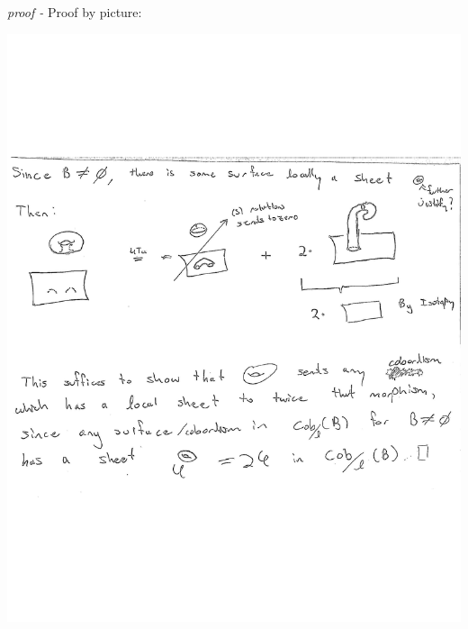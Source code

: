 \documentclass[11pt]{article}
\theoremstyle{definition}
\begin{document}
    \emph{proof - } Proof by picture:
    \begin{center}
        \includegraphics[width=\linewidth]{additional pdfs/4Tu and S relation imply.pdf}
    \end{center}

\end{document}
